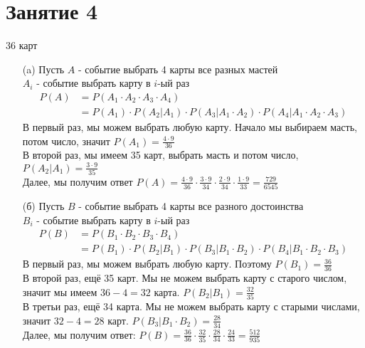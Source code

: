 \section*{Занятие 4}
\begin{exercise}[1] 36 карт
	\begin{enumerate}
		\item [(a)] Пусть $A$ - событие выбрать 4 карты все разных мастей \\ $A_i$ - событие выбрать карту в $i$-ый раз \\ \begin{align*}
			P(A) &= P(A_1 \cdot A_2 \cdot A_3 \cdot A_4) \\ &= P(A_1) \cdot P(A_2|A_1) \cdot P(A_3|A_1 \cdot A_2) \cdot P(A_4 | A_1 \cdot A_2 \cdot A_3)
		\end{align*} В первый раз, мы можем выбрать любую карту. Начало мы выбираем масть, потом число, значит $P(A_1) = \frac{4 \cdot 9}{36}$ \\ В второй раз, мы имеем 35 карт, выбрать масть и потом число, $P(A_2 | A_1) = \frac{3 \cdot 9}{35}$ \\ Далее, мы получим ответ $P(A) = \frac{4 \cdot 9}{36} \cdot \frac{3 \cdot 9}{34} \cdot \frac{2 \cdot 9}{34} \cdot \frac{1 \cdot 9}{33} = \frac{729}{6545}$
		\item [(б)] Пусть $B$ - событие выбрать 4 карты все разного достоинства \\ $B_i$ - событие выбрать карту в $i$-ый раз \\ \begin{align*}
			P(B) &= P(B_1 \cdot B_2 \cdot B_3 \cdot B_4) \\ &= P(B_1) \cdot P(B_2|B_1) \cdot P(B_3|B_1 \cdot B_2) \cdot P(B_4 | B_1 \cdot B_2 \cdot B_3)
		\end{align*} В первый раз, мы можем выбрать любую карту. Поэтому $P(B_1) = \frac{36}{36}$ \\ В второй раз, ещё 35 карт. Мы не можем выбрать карту с старого числом, значит мы имеем $36-4=32$ карта. $P(B_2 | B_1) = \frac{32}{35}$ \\ В третьи раз, ещё 34 карта. Мы не можем выбрать карту с старыми числами, значит $32-4=28$ карт. $P(B_3 | B_1 \cdot B_2) = \frac{28}{34}$ \\ Далее, мы получим ответ: $P(B) = \frac{36}{36} \cdot \frac{32}{35} \cdot \frac{28}{34} \cdot \frac{24}{33} = \frac{512}{935}$
	\end{enumerate}
\end{exercise}

